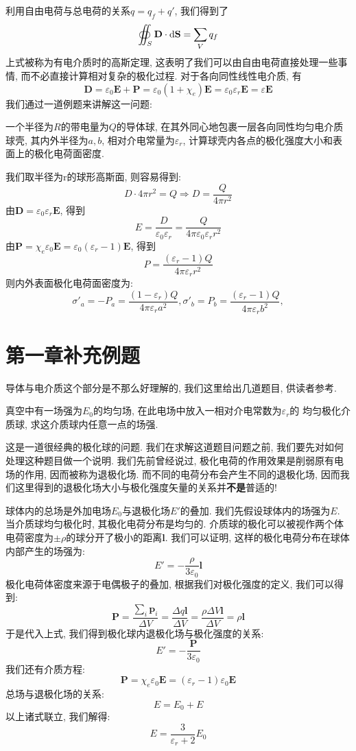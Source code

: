 利用自由电荷与总电荷的关系$q = q_f + q' $, 我们得到了
\[
\oiint_S \mathbf{D} \cdot \mathop{}\!\mathrm{d} \mathbf{S}  = \sum_V q_f
\]
上式被称为有电介质时的高斯定理, 这表明了我们可以由自由电荷直接处理一些事情, 而不必直接计算相对复杂的极化过程. 对于各向同性线性电介质, 有
\[
\mathbf{D} = \varepsilon_0 \mathbf{E}+\mathbf{P} = \varepsilon_0 (1+\chi_e)\mathbf{E} = \varepsilon_0\varepsilon_r\mathbf{E}=\varepsilon \mathbf{E}
\]
我们通过一道例题来讲解这一问题:
\begin{example}
  一个半径为$R$的带电量为$Q$的导体球, 在其外同心地包裹一层各向同性均匀电介质球壳, 其内外半径为$a,b$, 相对介电常量为$\varepsilon_r$, 计算球壳内各点的极化强度大小和表面上的极化电荷面密度.

  我们取半径为r的球形高斯面, 则容易得到:
  \[
  D\cdot4\pi r^2 = Q \Rightarrow D=\frac{Q}{4\pi r^2}
  \]
  由$\mathbf{D} = \varepsilon_0\varepsilon_r\mathbf{E}$, 得到
  \[
  E=\frac{D}{\varepsilon_0\varepsilon_r}=\frac{Q}{4\pi \varepsilon_0\varepsilon_r r^2}
  \]
  由$\mathbf{P}=\chi_e \varepsilon_0 \mathbf{E} = \varepsilon_0(\varepsilon_r-1)\mathbf{E}$, 得到
  \[
  P=\frac{(\varepsilon_r-1)Q}{4\pi \varepsilon_r r^2}
  \]
  则内外表面极化电荷面密度为:
  \[
  \sigma'_a=-P_a = \frac{(1-\varepsilon_r)Q}{4\pi \varepsilon_r a^2},\sigma'_b=P_b = \frac{(\varepsilon_r-1)Q}{4\pi \varepsilon_r b^2},
  \]
\end{example}
\section{第一章补充例题}
导体与电介质这个部分是不那么好理解的, 我们这里给出几道题目, 供读者参考.
\begin{example}
真空中有一场强为$E_0$的均匀场, 在此电场中放入一相对介电常数为$\varepsilon_r$的
均匀极化介质球, 求这介质球内任意一点的场强.

这是一道很经典的极化球的问题. 我们在求解这道题目问题之前, 我们要先对如何处理这种题目做一个说明. 我们先前曾经说过, 极化电荷的作用效果是削弱原有电场的作用, 因而被称为退极化场. 而不同的电荷分布会产生不同的退极化场, 因而我们这里得到的退极化场大小与极化强度矢量的关系并\textbf{不是}普适的!

球体内的总场是外加电场$E_0$与退极化场$E'$的叠加. 我们先假设球体内的场强为$E$. 当介质球均匀极化时, 其极化电荷分布是均匀的. 介质球的极化可以被视作两个体电荷密度为$\pm\rho$的球分开了极小的距离$\mathbf{l}$. 我们可以证明, 这样的极化电荷分布在球体内部产生的场强为:
\[
E'=-\frac{\rho}{3\varepsilon_0}\mathbf{l}
\]
极化电荷体密度来源于电偶极子的叠加, 根据我们对极化强度的定义, 我们可以得到:
\[
\mathbf{P}=\frac{\sum_i \mathbf{p}_i}{\Delta V}=\frac{\Delta q \mathbf{l}}{\Delta V}=\frac{\rho \Delta V \mathbf{l}}{\Delta V}=\rho \mathbf{l}
\]
于是代入上式, 我们得到极化球内退极化场与极化强度的关系:
\[
E'=-\frac{\mathbf{P}}{3\varepsilon_0}
\]
我们还有介质方程:
\[
\mathbf{P}= \chi_e \varepsilon_0 \mathbf{E}= (\varepsilon_r-1)\varepsilon_0 \mathbf{E}
\]
总场与退极化场的关系:
\[
E=E_0+E
\]
以上诸式联立, 我们解得:
\[
E=\frac{3}{\varepsilon_r+2}E_0
\]
\end{example}

